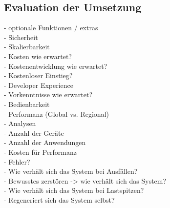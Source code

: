\subsection{Evaluation der Umsetzung}\label{subsec:Evaluation der Umsetzung}
- optionale Funktionen / extras\\
- Sicherheit\\
- Skalierbarkeit\\
- Kosten wie erwartet?\\
- Kostenentwicklung wie erwartet?\\
- Kostenloser Einstieg?\\
- Developer Experience\\
- Vorkenntnisse wie erwartet?\\
- Bedienbarkeit\\
- Performanz (Global vs. Regional)\\
- Analysen\\
- Anzahl der Geräte\\
- Anzahl der Anwendungen\\
- Kosten für Performanz\\
- Fehler?\\
- Wie verhält sich das System bei Ausfällen?\\
- Bewusstes zerstören -> wie verhält sich das System?\\
- Wie verhält sich das System bei Lastspitzen?\\
- Regeneriert sich das System selbst?\\
